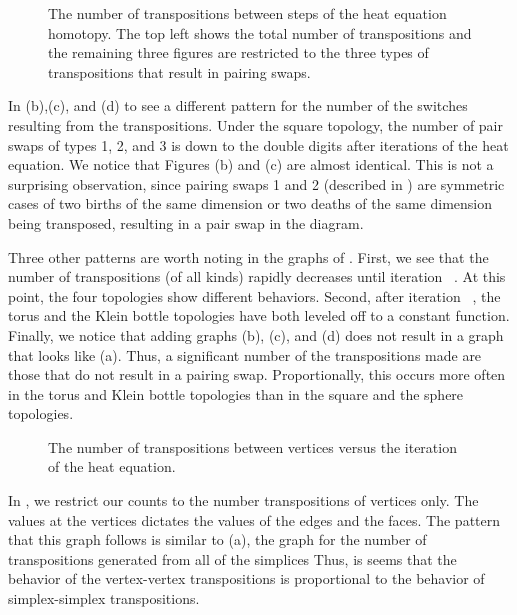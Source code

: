 \begin{figure}[hbt]
	\centering
 \caption{The number of transpositions between steps of the heat equation
          homotopy.  The top left shows the total number of transpositions and
          the remaining three figures are restricted to the three types of
          transpositions that result in pairing swaps.}
 \label{fig:numTrans}
\end{figure}
In  (b),(c), and (d) to see a different pattern for 
the number of the switches resulting from the transpositions.
Under the square topology, the number of pair swaps of types 1,
2, and 3 is down to the double digits after  iterations of the heat 
equation.
We notice that Figures (b) and (c) are almost identical.  This is not a 
surprising observation, since pairing swaps 1 and 2 (described in 
) are symmetric cases of two births of the same dimension
or two deaths of the same dimension being transposed, resulting in a pair swap
in the diagram.

Three other patterns are worth noting in the graphs of .  
First, we see that
the number of transpositions (of all kinds) rapidly decreases until 
iteration ~.  At this point, the four topologies show different behaviors.
Second, after iteration ~, the torus and the Klein bottle topologies have
both leveled off to a constant function.
Finally, we notice that adding graphs (b), (c), and (d) does not result
in a graph that looks like (a).  Thus, a significant number of the
transpositions made are those that do not result in a pairing swap.
Proportionally, this occurs more often in the torus and Klein bottle topologies
than in the square and the sphere topologies.

\begin{figure}[hbt]
 \vspace*{0.1in}
 \centering
 \centerline{}
 \caption{The number of transpositions between vertices versus the iteration
          of the heat equation.}
 \label{fig:vertexTranspositions}
\end{figure}
In , we restrict our counts to the number 
transpositions of vertices only.  The
values at the vertices dictates the values of the edges and the faces.  The
pattern that this graph follows is similar to 
(a), the graph for the number of transpositions 
generated from all of the simplices  Thus, is seems that the behavior of the vertex-vertex 
transpositions is proportional to the behavior of simplex-simplex 
transpositions.

